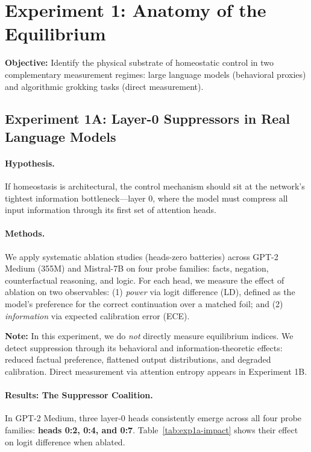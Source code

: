 \section{Experiment 1: Anatomy of the Equilibrium}\label{sec:exp1}

\textbf{Objective:} Identify the physical substrate of homeostatic control in two complementary measurement regimes: large language models (behavioral proxies) and algorithmic grokking tasks (direct measurement).

\subsection{Experiment 1A: Layer-0 Suppressors in Real Language Models}

\paragraph{Hypothesis.}
If homeostasis is architectural, the control mechanism should sit at the network's tightest information bottleneck—layer 0, where the model must compress all input information through its first set of attention heads.

\paragraph{Methods.}
We apply systematic ablation studies (heads-zero batteries) across GPT-2 Medium (355M) and Mistral-7B on four probe families: facts, negation, counterfactual reasoning, and logic. For each head, we measure the effect of ablation on two observables: (1) \emph{power} via logit difference (LD), defined as the model's preference for the correct continuation over a matched foil; and (2) \emph{information} via expected calibration error (ECE).

\textbf{Note:} In this experiment, we do \emph{not} directly measure equilibrium indices. We detect suppression through its behavioral and information-theoretic effects: reduced factual preference, flattened output distributions, and degraded calibration. Direct measurement via attention entropy appears in Experiment 1B.

\paragraph{Results: The Suppressor Coalition.}
In GPT-2 Medium, three layer-0 heads consistently emerge across all four probe families: \textbf{heads 0:2, 0:4, and 0:7}. Table~\ref{tab:exp1a-impact} shows their effect on logit difference when ablated.

